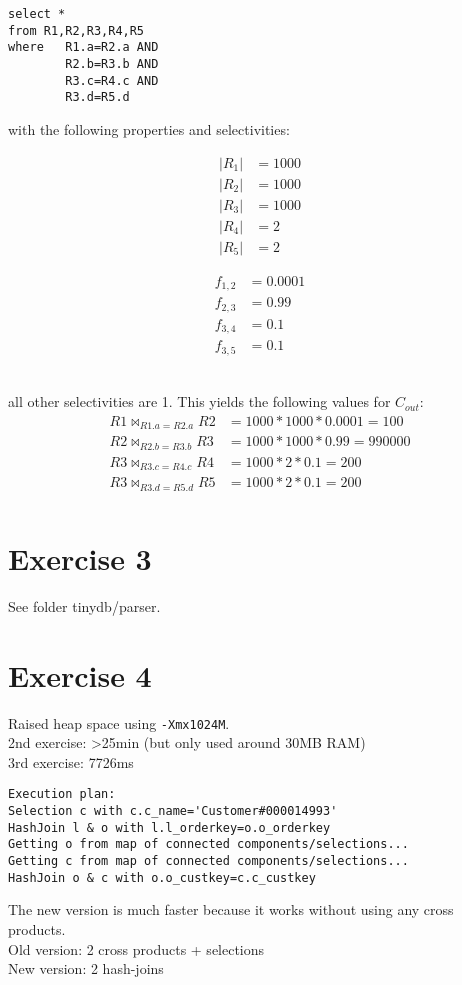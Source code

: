 \documentclass[11pt,a4paper]{scrartcl}
\begin{document}
\begin{verbatim}
select *
from R1,R2,R3,R4,R5
where 	R1.a=R2.a AND
		R2.b=R3.b AND
		R3.c=R4.c AND
		R3.d=R5.d
\end{verbatim}
with the following properties and selectivities:\\
\begin{minipage}{.2\textwidth}
\begin{align*}
|R_1|&=1000\\
|R_2|&=1000\\
|R_3|&=1000\\
|R_4|&=2\\
|R_5|&=2
\end{align*}
\end{minipage}
\begin{minipage}{.2\textwidth}
\begin{align*}
f_{1,2}&=0.0001\\
f_{2,3}&=0.99\\
f_{3,4}&=0.1\\
f_{3,5}&=0.1
\end{align*}
\end{minipage}\\
all other selectivities are 1.
This yields the following values for $C_{out}$:
\begin{align*}
R1 \bowtie_{R1.a=R2.a} R2 &= 1000*1000*0.0001 = 100\\
R2 \bowtie_{R2.b=R3.b} R3 &= 1000*1000*0.99 = 990000\\
R3 \bowtie_{R3.c=R4.c} R4 &= 1000*2*0.1 = 200\\
R3 \bowtie_{R3.d=R5.d} R5 &= 1000*2*0.1 = 200\\
\end{align*}


\section*{Exercise 3}
See folder tinydb/parser.


\section*{Exercise 4}
Raised heap space using \verb|-Xmx1024M|.\\
2nd exercise: >25min (but only used around 30MB RAM)\\ %
3rd exercise: 7726ms
\begin{verbatim}
Execution plan:
Selection c with c.c_name='Customer#000014993'
HashJoin l & o with l.l_orderkey=o.o_orderkey
Getting o from map of connected components/selections...
Getting c from map of connected components/selections...
HashJoin o & c with o.o_custkey=c.c_custkey
\end{verbatim}
The new version is much faster because it works without using any cross products.\\
Old version: 2 cross products + selections\\
New version: 2 hash-joins
\end{document}
